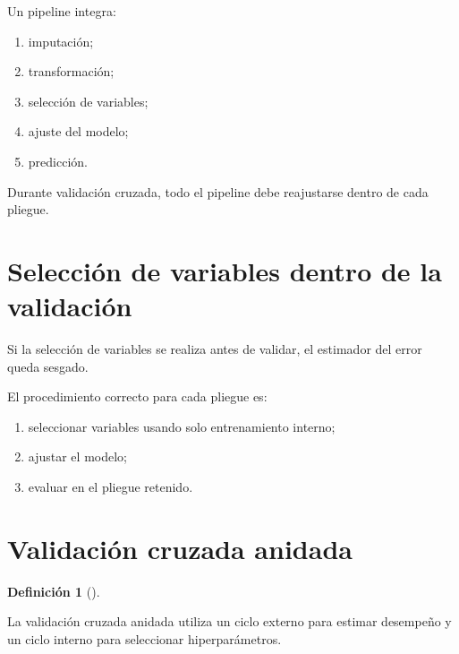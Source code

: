 \documentclass[
  spanish,
  10.5pt,
  letterpaper,
  DIV=11,
  numbers=noendperiod,
  oneside,
  open=any]{scrreprt}
\providecommand{\tightlist}{%
  \setlength{\itemsep}{0pt}\setlength{\parskip}{0pt}}
\theoremstyle{definition}
\newtheorem{definition}{Definición}[chapter]
\theoremstyle{definition}
\theoremstyle{plain}
\theoremstyle{remark}
\begin{document}
Un pipeline integra:

\begin{enumerate}
\def\labelenumi{\arabic{enumi}.}
\tightlist
\item
  imputación;
\item
  transformación;
\item
  selección de variables;
\item
  ajuste del modelo;
\item
  predicción.
\end{enumerate}

Durante validación cruzada, todo el pipeline debe reajustarse dentro de
cada pliegue.

\section*{Selección de variables dentro de la
validación}\label{selecciuxf3n-de-variables-dentro-de-la-validaciuxf3n}


Si la selección de variables se realiza antes de validar, el estimador
del error queda sesgado.

El procedimiento correcto para cada pliegue es:

\begin{enumerate}
\def\labelenumi{\arabic{enumi}.}
\tightlist
\item
  seleccionar variables usando solo entrenamiento interno;
\item
  ajustar el modelo;
\item
  evaluar en el pliegue retenido.
\end{enumerate}

\section*{Validación cruzada
anidada}\label{validaciuxf3n-cruzada-anidada}


\begin{definition}[]\protect\hypertarget{def-validacion-anidada}{}\label{def-validacion-anidada}

La validación cruzada anidada utiliza un ciclo externo para estimar
desempeño y un ciclo interno para seleccionar hiperparámetros.

\end{definition}
\end{document}

